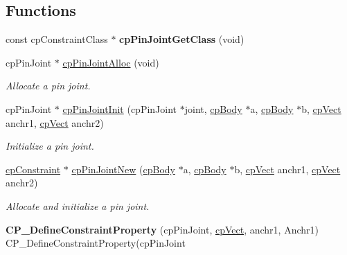 \subsection*{Functions}
\begin{DoxyCompactItemize}
\item 
\hypertarget{group__cp_pin_joint_ga368588970ebb488aa22d9ea9b2574aeb}{const cp\-Constraint\-Class $\ast$ {\bfseries cp\-Pin\-Joint\-Get\-Class} (void)}\label{group__cp_pin_joint_ga368588970ebb488aa22d9ea9b2574aeb}

\item 
\hypertarget{group__cp_pin_joint_ga12e5fcaa7d39e47e6f1ac9777744fec5}{cp\-Pin\-Joint $\ast$ \hyperlink{group__cp_pin_joint_ga12e5fcaa7d39e47e6f1ac9777744fec5}{cp\-Pin\-Joint\-Alloc} (void)}\label{group__cp_pin_joint_ga12e5fcaa7d39e47e6f1ac9777744fec5}

\begin{DoxyCompactList}\small\item\em Allocate a pin joint. \end{DoxyCompactList}\item 
\hypertarget{group__cp_pin_joint_ga43e7c4abdb1a3245f8a224cdab1052bb}{cp\-Pin\-Joint $\ast$ \hyperlink{group__cp_pin_joint_ga43e7c4abdb1a3245f8a224cdab1052bb}{cp\-Pin\-Joint\-Init} (cp\-Pin\-Joint $\ast$joint, \hyperlink{structcp_body}{cp\-Body} $\ast$a, \hyperlink{structcp_body}{cp\-Body} $\ast$b, \hyperlink{structcp_vect}{cp\-Vect} anchr1, \hyperlink{structcp_vect}{cp\-Vect} anchr2)}\label{group__cp_pin_joint_ga43e7c4abdb1a3245f8a224cdab1052bb}

\begin{DoxyCompactList}\small\item\em Initialize a pin joint. \end{DoxyCompactList}\item 
\hypertarget{group__cp_pin_joint_ga4ad2cdd039d27c2aa9c16f4d34c346ec}{\hyperlink{structcp_constraint}{cp\-Constraint} $\ast$ \hyperlink{group__cp_pin_joint_ga4ad2cdd039d27c2aa9c16f4d34c346ec}{cp\-Pin\-Joint\-New} (\hyperlink{structcp_body}{cp\-Body} $\ast$a, \hyperlink{structcp_body}{cp\-Body} $\ast$b, \hyperlink{structcp_vect}{cp\-Vect} anchr1, \hyperlink{structcp_vect}{cp\-Vect} anchr2)}\label{group__cp_pin_joint_ga4ad2cdd039d27c2aa9c16f4d34c346ec}

\begin{DoxyCompactList}\small\item\em Allocate and initialize a pin joint. \end{DoxyCompactList}\item 
\hypertarget{group__cp_pin_joint_ga0b17a79efa03bf502d8d59fc6210d95a}{{\bfseries C\-P\-\_\-\-Define\-Constraint\-Property} (cp\-Pin\-Joint, \hyperlink{structcp_vect}{cp\-Vect}, anchr1, Anchr1) C\-P\-\_\-\-Define\-Constraint\-Property(cp\-Pin\-Joint}\label{group__cp_pin_joint_ga0b17a79efa03bf502d8d59fc6210d95a}

\end{DoxyCompactItemize}
